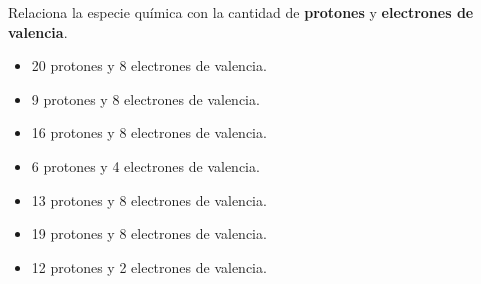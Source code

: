 \question Relaciona la especie química con la cantidad de \textbf{protones} y \textbf{electrones de valencia}.

\begin{minipage}{0.5\textwidth}
\end{minipage}%
\begin{minipage}{0.5\textwidth}
    \begin{itemize}
        \item[\rule{1cm}{0.2mm}] 20 protones y 8 electrones de valencia.
        \item[\rule{1cm}{0.2mm}] 9 protones y 8 electrones de valencia.
        \item[\rule{1cm}{0.2mm}] 16 protones y 8 electrones de valencia.
        \item[\rule{1cm}{0.2mm}] 6 protones y 4 electrones de valencia.
        \item[\rule{1cm}{0.2mm}] 13 protones y 8 electrones de valencia.
        \item[\rule{1cm}{0.2mm}] 19 protones y 8 electrones de valencia.
        \item[\rule{1cm}{0.2mm}] 12 protones y 2 electrones de valencia.
    \end{itemize}
\end{minipage}
